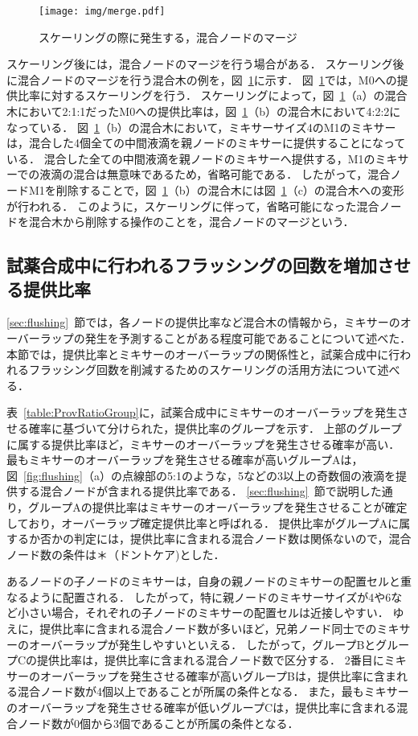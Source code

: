 \begin{figure}[tbp]
 \centering\texttt{[image: img/merge.pdf]}
 \caption{スケーリングの際に発生する，混合ノードのマージ}\label{fig:Merge}
\end{figure}

スケーリング後には，混合ノードのマージを行う場合がある．
スケーリング後に混合ノードのマージを行う混合木の例を，図~\ref{fig:Merge}に示す．
図~\ref{fig:Merge}では，M0への提供比率に対するスケーリングを行う．
スケーリングによって，図~\ref{fig:Merge}（a）の混合木において2:1:1だったM0への提供比率は，図~\ref{fig:Merge}（b）の混合木において4:2:2になっている．
図~\ref{fig:Merge}（b）の混合木において，ミキサーサイズ4のM1のミキサーは，混合した4個全ての中間液滴を親ノードのミキサーに提供することになっている．
混合した全ての中間液滴を親ノードのミキサーへ提供する，M1のミキサーでの液滴の混合は無意味であるため，省略可能である．
したがって，混合ノードM1を削除することで，図~\ref{fig:Merge}（b）の混合木には図~\ref{fig:Merge}（c）の混合木への変形が行われる．
このように，スケーリングに伴って，省略可能になった混合ノードを混合木から削除する操作のことを，混合ノードのマージという．

\subsection{試薬合成中に行われるフラッシングの回数を増加させる提供比率}\label{ratio}
\ref{sec:flushing}~節では，各ノードの提供比率など混合木の情報から，ミキサーのオーバーラップの発生を予測することがある程度可能であることについて述べた．
本節では，提供比率とミキサーのオーバーラップの関係性と，試薬合成中に行われるフラッシング回数を削減するためのスケーリングの活用方法について述べる．

表~\ref{table:ProvRatioGroup}に，試薬合成中にミキサーのオーバーラップを発生させる確率に基づいて分けられた，提供比率のグループを示す．
上部のグループに属する提供比率ほど，ミキサーのオーバーラップを発生させる確率が高い．
最もミキサーのオーバーラップを発生させる確率が高いグループAは，図~\ref{fig:flushing}（a）の点線部の5:1のような，5などの3以上の奇数個の液滴を提供する混合ノードが含まれる提供比率である．
\ref{sec:flushing}~節で説明した通り，グループAの提供比率はミキサーのオーバーラップを発生させることが確定しており，オーバーラップ確定提供比率と呼ばれる．
提供比率がグループAに属するか否かの判定には，提供比率に含まれる混合ノード数は関係ないので，混合ノード数の条件は＊（ドントケア)とした．

あるノードの子ノードのミキサーは，自身の親ノードのミキサーの配置セルと重なるように配置される．
したがって，特に親ノードのミキサーサイズが4や6など小さい場合，それぞれの子ノードのミキサーの配置セルは近接しやすい．
ゆえに，提供比率に含まれる混合ノード数が多いほど，兄弟ノード同士でのミキサーのオーバーラップが発生しやすいといえる．
したがって，グループBとグループCの提供比率は，提供比率に含まれる混合ノード数で区分する．
2番目にミキサーのオーバーラップを発生させる確率が高いグループBは，提供比率に含まれる混合ノード数が4個以上であることが所属の条件となる．
また，最もミキサーのオーバーラップを発生させる確率が低いグループCは，提供比率に含まれる混合ノード数が0個から3個であることが所属の条件となる．

